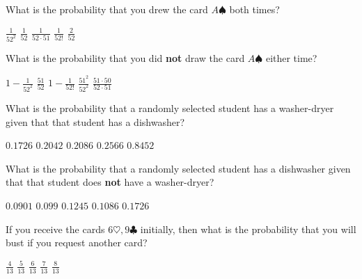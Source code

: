 \documentclass[answers,12pt]{exam}
\begin{document}
\begin{questions}
\question\label{FirstDeck} What is the probability that you
drew the card $A\spadesuit$ both times?\\
\begin{oneparchoices}
\correctchoice $\frac{1}{52^2}$
\choice $\frac{1}{52}$
\choice $\frac{1}{52\cdot 51}$
\choice $\frac{1}{52!}$
\choice $\frac{2}{52}$
\end{oneparchoices}

\question\label{LastDeck} What is the probability that you
did {\bf not} draw the card $A\spadesuit$ either time?\\
\begin{oneparchoices}
\choice $1-\frac{1}{52^2}$
\choice $\frac{51}{52}$
\choice $1-\frac{1}{52!}$
\correctchoice $\frac{51^2}{52^2}$
\choice $\frac{51\cdot 50}{52\cdot 51}$
\end{oneparchoices}


\question\label{FirstAmes} What is the probability that a randomly selected
student has a washer-dryer given that that student has a dishwasher?\\
\begin{oneparchoices}
\choice $0.1726$ %
\correctchoice $0.2042$
\choice $0.2086$ %
\choice $0.2566$ %
\choice $0.8452$ %
\end{oneparchoices}

\question\label{LastAmes} What is the probability that a randomly selected
student has a dishwasher given that that student does {\bf not}
have a washer-dryer?\\
\begin{oneparchoices}
\correctchoice $0.0901$
\choice $0.099$ %
\choice $0.1245$ %
\choice $0.1086$ %
\choice $0.1726$ %
\end{oneparchoices}


\question\label{FirstBJ}
If you receive the cards $6\heartsuit,9\clubsuit$
initially, then what is the probability that you will bust if you
request another card?\\
\begin{oneparchoices}
\choice $\frac{4}{13}$
\choice $\frac{5}{13}$
\choice $\frac{6}{13}$ %
\correctchoice $\frac{7}{13}$
\choice $\frac{8}{13}$ %
\end{oneparchoices}


\end{questions}
\end{document}

